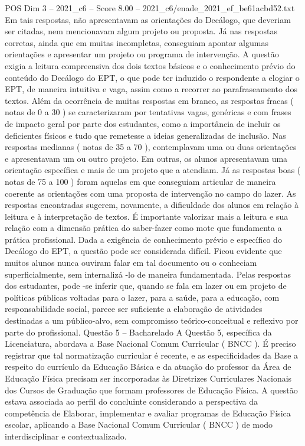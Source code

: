 \begin{textsample}{POS Dim 3 – 2021\_c6 – Score 8.00 – 2021\_c6/enade\_2021\_ef\_be61acbd52.txt}
Em tais respostas, não apresentavam as orientações do Decálogo, que deveriam ser citadas, nem mencionavam algum projeto ou proposta.
Já nas respostas corretas, ainda que em muitas incompletas, conseguiam apontar algumas orientações e apresentar um projeto ou programa de intervenção.
A questão exigia a leitura compreensiva dos dois textos básicos e o conhecimento prévio do conteúdo do Decálogo do EPT, o que pode ter induzido o respondente a elogiar o EPT, de maneira intuitiva e vaga, assim como a recorrer ao parafraseamento dos textos.
Além da ocorrência de muitas respostas em branco, as respostas fracas ( notas de 0 a 30 ) se caracterizaram por tentativas vagas, genéricas e com frases de impacto geral por parte dos estudantes, como a importância de incluir os deficientes físicos e tudo que remetesse a ideias generalizadas de inclusão.
Nas respostas medianas ( notas de 35 a 70 ), contemplavam uma ou duas orientações e apresentavam um ou outro projeto.
Em outras, os alunos apresentavam uma orientação específica e mais de um projeto que a atendiam.
Já as respostas boas ( notas de 75 a 100 ) foram aquelas em que conseguiam articular de maneira coerente as orientações com uma proposta de intervenção no campo do lazer.
As respostas encontradas sugerem, novamente, a dificuldade dos alunos em relação à leitura e à interpretação de textos.
É importante valorizar mais a leitura e sua relação com a dimensão prática do saber-fazer como mote que fundamenta a prática profissional.
Dada a exigência de conhecimento prévio e específico do Decálogo do EPT, a questão pode ser considerada difícil.
Ficou evidente que muitos alunos nunca ouviram falar em tal documento ou o conheciam superficialmente, sem internalizá -lo de maneira fundamentada.
Pelas respostas dos estudantes, pode -se inferir que, quando se fala em lazer ou em projeto de políticas públicas voltadas para o lazer, para a saúde, para a educação, com responsabilidade social, parece ser suficiente a elaboração de atividades destinadas a um público-alvo, sem compromisso teórico-conceitual e reflexivo por parte do profissional.
Questão 5 – Bacharelado A Questão 5, específica da Licenciatura, abordava a Base Nacional Comum Curricular ( BNCC ).
É preciso registrar que tal normatização curricular é recente, e as especificidades da Base a respeito do currículo da Educação Básica e da atuação do professor da Área de Educação Física precisam ser incorporadas às Diretrizes Curriculares Nacionais dos Cursos de Graduação que formam professores de Educação Física.
A questão estava associada ao perfil do concluinte considerando a perspectiva da competência de Elaborar, implementar e avaliar programas de Educação Física escolar, aplicando a Base Nacional Comum Curricular ( BNCC ) de modo interdisciplinar e contextualizado.

\end{textsample}
